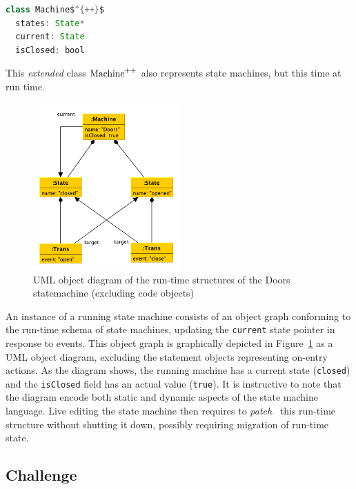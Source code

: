 \documentclass[english,submission]{programming}
\begin{document}
\begin{lstlisting}[language=java,morekeywords={on},mathescape=true]
class Machine$^{++}$
  states: State*
  current: State
  isClosed: bool
\end{lstlisting}

This \textit{extended} class $\text{\lstinline{Machine}}^{++}$ also represents state machines, but this time at run time.



\begin{figure}[t]
  \centering
\includegraphics[width=0.5\textwidth]{figures/doorsmachine.pdf}
\caption{UML object diagram of the run-time structures of the Doors statemachine (excluding code objects)}
\label{FIG:doorsRuntime}
\end{figure}


An instance of a running state machine consists of an object graph conforming to the run-time schema of state machines, updating the \lstinline{current} state pointer in response to events. This object graph is graphically depicted in Figure~\ref{FIG:doorsRuntime} as a UML object diagram, excluding the statement objects representing on-entry actions. As the diagram shows, the running machine has a current state (\lstinline{closed}) and the \lstinline{isClosed} field has an actual value (\lstinline{true}). It is instructive to note that the diagram encode both static and dynamic aspects of the state machine language. Live editing the state machine then requires to \textit{patch}~\cite{SemanticDeltas} this run-time structure without shutting it down, possibly requiring migration of run-time state.

\subsection{Challenge}
\end{document}
